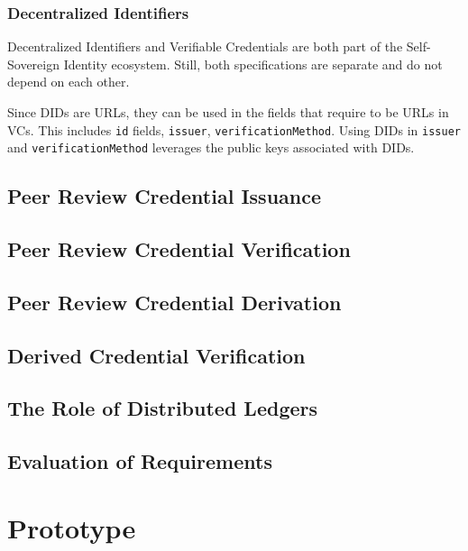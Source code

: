 \subsubsection{Decentralized Identifiers}

Decentralized Identifiers and Verifiable Credentials are both part of the Self-Sovereign Identity ecosystem. Still, both specifications are separate and do not depend on each other. 

Since DIDs are URLs, they can be used in the fields that require to be URLs in VCs. This includes \lstinline{id} fields, \lstinline{issuer}, \lstinline{verificationMethod}. Using DIDs in \lstinline{issuer} and \lstinline{verificationMethod} leverages the public keys associated with DIDs.


\subsection{Peer Review Credential Issuance}


\subsection{Peer Review Credential Verification}


\subsection{Peer Review Credential Derivation}


\subsection{Derived Credential Verification}

\subsection{The Role of Distributed Ledgers}

\subsection{Evaluation of Requirements}















\section{Prototype}

